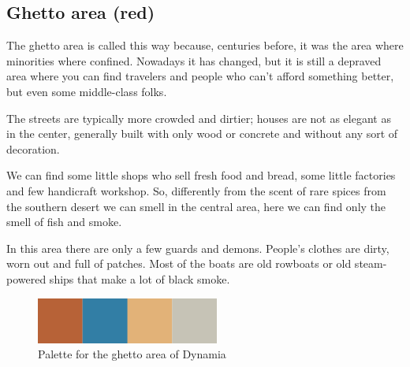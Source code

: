 \subsection{Ghetto area (red)}
The ghetto area is called this way because, centuries before, it was the area where  minorities where confined. Nowadays it has changed, but it is still a depraved area where you can find travelers and people who can't afford something better, but even some middle-class folks.

The streets are typically more crowded and dirtier; houses are not as elegant as in the center, generally built with only wood or concrete and without any sort of decoration.

We can find some little shops who sell fresh food and bread, some little factories and few handicraft workshop. So, differently from the scent of rare spices from the southern desert we can smell in the central area, here we can find only the smell of fish and smoke.

In this area there are only a few guards and demons. People's clothes are dirty, worn out and full of patches. Most of the boats are old rowboats or old steam-powered ships that make a lot of black smoke.

\begin{figure}[H]
  \centering
  \includegraphics[width=6cm]{Images/Palettes/dynamiaGhettoArea}
  \caption{Palette for the ghetto area of Dynamia}
\end{figure}
